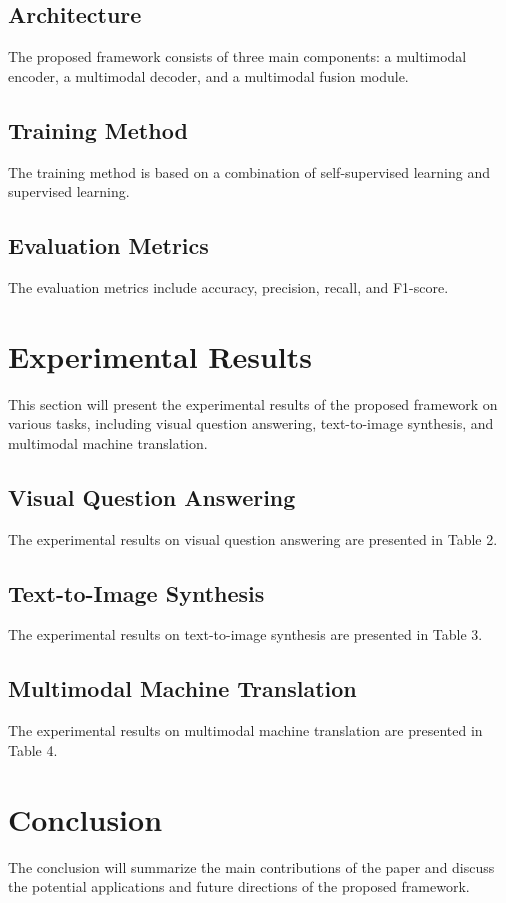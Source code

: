 \documentclass{article}
\begin{document}
\subsection{Architecture}
The proposed framework consists of three main components: a multimodal encoder, a multimodal decoder, and a multimodal fusion module.

\subsection{Training Method}
The training method is based on a combination of self-supervised learning and supervised learning.

\subsection{Evaluation Metrics}
The evaluation metrics include accuracy, precision, recall, and F1-score.

\section{Experimental Results}
This section will present the experimental results of the proposed framework on various tasks, including visual question answering, text-to-image synthesis, and multimodal machine translation.

\subsection{Visual Question Answering}
The experimental results on visual question answering are presented in Table 2.

\subsection{Text-to-Image Synthesis}
The experimental results on text-to-image synthesis are presented in Table 3.

\subsection{Multimodal Machine Translation}
The experimental results on multimodal machine translation are presented in Table 4.

\section{Conclusion}
The conclusion will summarize the main contributions of the paper and discuss the potential applications and future directions of the proposed framework.
\end{document}
